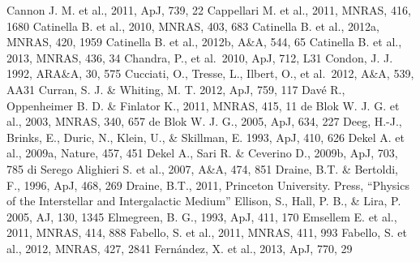 \begin{thebibliography}{99}
\begin{multicols}{2}
{	Cannon J. M. et al., 2011, ApJ, 739, 22
	Cappellari M. et al., 2011, MNRAS, 416, 1680
	Catinella B. et al., 2010, MNRAS, 403, 683
	Catinella B. et al., 2012a, MNRAS, 420, 1959
	Catinella B. et al., 2012b, A\&A, 544, 65
	Catinella B. et al., 2013, MNRAS, 436, 34
   	 Chandra, P., et al.\ 2010, ApJ, 712, L31
 	Condon, J. J. 1992, ARA\&A, 30, 575
	Cucciati, O., Tresse, L., Ilbert, O., et al.\ 2012, A\&A, 539, AA31 
	Curran, S. J. \& Whiting, M. T. 2012, ApJ, 759, 117
	Dav\'{e} R., Oppenheimer B. D. \& Finlator K., 2011, MNRAS, 415, 11
	de Blok W. J. G. et al., 2003, MNRAS, 340, 657
	de Blok W. J. G., 2005, ApJ, 634, 227
    	Deeg, H.-J., Brinks, E., Duric, N., Klein, U., \& Skillman, E. 1993, ApJ, 410, 626
	Dekel A. et al., 2009a, Nature, 457, 451
	Dekel A., Sari R. \& Ceverino D., 2009b, ApJ, 703, 785
	di Serego Alighieri S. et al., 2007, A\&A, 474, 851
	Draine, B.T. \& Bertoldi, F., 1996, ApJ, 468, 269
	Draine, B.T., 2011, Princeton University. Press, ``Physics of the Interstellar and Intergalactic Medium''
    	Ellison, S.,  Hall, P. B., \& Lira, P. 2005, AJ, 130, 1345
	Elmegreen, B. G., 1993, ApJ, 411, 170
	Emsellem E. et al., 2011, MNRAS, 414, 888
	Fabello, S. et al., 2011, MNRAS, 411, 993
	Fabello, S. et al., 2012, MNRAS, 427, 2841
	Fern{\'a}ndez, X. et al., 2013, ApJ, 770, 29
}
\end{multicols}
\end{thebibliography}

